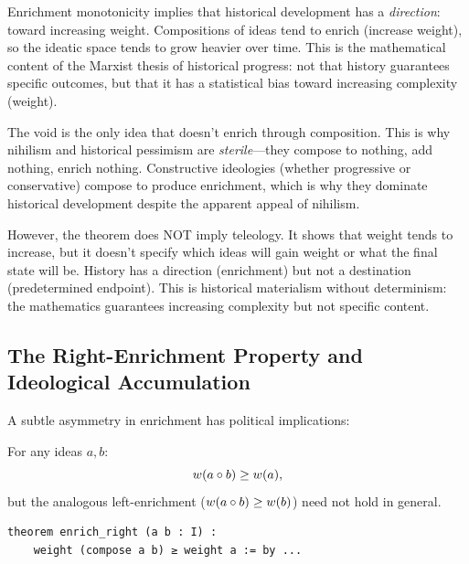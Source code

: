 \begin{interpretation}
Enrichment monotonicity implies that historical development has a \emph{direction}:
toward increasing weight. Compositions of ideas tend to enrich (increase weight),
so the ideatic space tends to grow heavier over time. This is the mathematical
content of the Marxist thesis of historical progress: not that history guarantees
specific outcomes, but that it has a statistical bias toward increasing complexity
(weight).

The void is the only idea that doesn't enrich through composition. This is why
nihilism and historical pessimism are \emph{sterile}---they compose to nothing,
add nothing, enrich nothing. Constructive ideologies (whether progressive or
conservative) compose to produce enrichment, which is why they dominate historical
development despite the apparent appeal of nihilism.

However, the theorem does NOT imply teleology. It shows that weight tends to
increase, but it doesn't specify which ideas will gain weight or what the final
state will be. History has a direction (enrichment) but not a destination
(predetermined endpoint). This is historical materialism without determinism:
the mathematics guarantees increasing complexity but not specific content.
\end{interpretation}

\subsection{The Right-Enrichment Property and Ideological Accumulation}

A subtle asymmetry in enrichment has political implications:

\begin{theorem}
\label{thm:right-enrichment}
For any ideas $a, b$:
\[
  w(a \circ b) \geq w(a),
\]
but the analogous left-enrichment ($w(a \circ b) \geq w(b)$)
need not hold in general.
\end{theorem}

\begin{lstlisting}[caption={Right enrichment (IDT\_v3\_Emergence.lean)}]
theorem enrich_right (a b : I) :
    weight (compose a b) ≥ weight a := by ...
\end{lstlisting}

